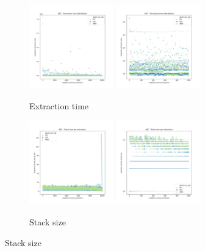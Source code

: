 \begin{figure}
    \begin{subfigure}[b]{\textwidth}
        \centering
        \includegraphics[width=0.40\textwidth]{./fragments/05_workhorse_experiment/images/01_basebenchmark_02_sort_a_case.png.1_0.png}
        \includegraphics[width=0.40\textwidth]{./fragments/05_workhorse_experiment/images/01_basebenchmark_02_sort_a_case.png.1_1.png}
        \caption{Extraction time}
        \label{FIG:WORKHORSE_BENCHMARK_02__0_0}
    \end{subfigure}

    \begin{subfigure}[b]{\textwidth}
        \centering
        \includegraphics[width=0.40\textwidth]{./fragments/05_workhorse_experiment/images/01_basebenchmark_02_sort_a_case.png.2_0.png}
        \includegraphics[width=0.40\textwidth]{./fragments/05_workhorse_experiment/images/01_basebenchmark_02_sort_a_case.png.2_1.png}
        \caption{Stack size}
        \label{FIG:WORKHORSE_BENCHMARK_02__0_0}
    \end{subfigure}
    

\end{figure}
